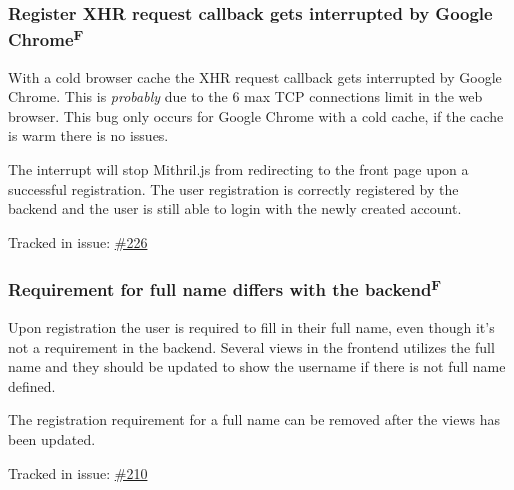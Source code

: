 \documentclass[12pt,a4paper]{report}
\begin{document}
\subsubsection{Register XHR request callback gets interrupted by Google  Chrome\texorpdfstring{\textsuperscript{F}}{}}
With a cold browser cache the XHR request callback gets interrupted by Google Chrome. This is \textit{probably} due to the 6 max TCP connections limit in the web browser. This bug only occurs for Google Chrome with a cold cache, if the cache is warm there is no issues.

The interrupt will stop Mithril.js from redirecting to the front page upon a successful registration. The user registration is correctly registered by the backend and the user is still able to login with the newly created account.

Tracked in issue: \href{https://github.com/LuleaUniversityOfTechnology/2018-project-roaster/issues/226}{\#226}

\subsubsection{Requirement for full name differs with the backend\texorpdfstring{\textsuperscript{F}}{}}
Upon registration the user is required to fill in their full name, even though it's not a requirement in the backend. Several views in the frontend utilizes the full name and they should be updated to show the username if there is not full name defined.

The registration requirement for a full name can be removed after the views has been updated.

Tracked in issue: \href{https://github.com/LuleaUniversityOfTechnology/2018-project-roaster/issues/210}{\#210}
\end{document}
